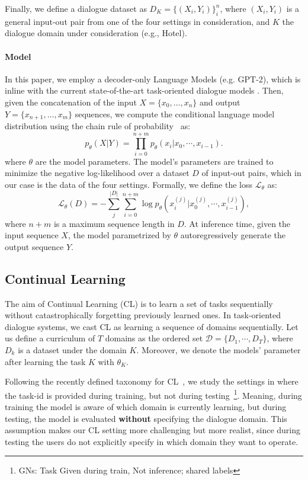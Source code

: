 \documentclass[11pt,a4paper]{article}
\begin{document}
Finally, we define a dialogue dataset as $D_K=\{(X_i,Y_i)\}_{i}^{n}$, where $(X_i,Y_i)$ is a general input-out pair from one of the four settings in consideration, and $K$ the dialogue domain under consideration (e.g., Hotel).   

\paragraph{Model} In this paper, we employ a decoder-only Language Models (e.g. GPT-2), which is inline with the current state-of-the-art task-oriented dialogue models \citet{peng2020soloist,hosseini2020simple}. Then, given the concatenation of the input $X= \{x_{0},\dots,x_{n}\}$ and output $Y= \{x_{n+1},\dots,x_{m}\}$ sequences, we compute the conditional language model distribution using the chain rule of probability~\cite{bengio2003neural} as:
\begin{equation}
    p_{\theta}(X|Y) =  \prod_{i=0}^{n+m}p_{\theta}(x_i|x_{0}, \cdots, x_{i-1}).
\end{equation}
where $\theta$ are the model parameters. The model's parameters are trained to minimize the negative log-likelihood over a dataset $D$ of input-out pairs, which in our case is the data of the four settings. Formally, we define the loss $\mathcal{L}_{\theta}$ as:
\begin{equation}
  \mathcal{L}_{\theta}(D) =  - \sum_j^{|D|} \sum_{i=0}^{n+m} \log p_{\theta}(x_i^{(j)}|x_{0}^{(j)}, \cdots, x_{i-1}^{(j)}), \label{eq:loss}
\end{equation}
where $n+m$ is a maximum sequence length in $D$. At inference time, given the input sequence $X$, the model parametrized by $\theta$ autoregressively generate the output sequence $Y$. 
\subsection{Continual Learning} \label{subsec:CL}
The aim of Continual Learning (CL) is to learn a set of tasks sequentially without catastrophically forgetting previously learned ones. In task-oriented dialogue systems, we cast CL as learning a sequence of domains sequentially. Let us define a curriculum of $T$ domains as the ordered set $\mathcal{D}=\{D_1, \cdots, D_T\}$, where $D_k$ is a dataset under the domain $K$. Moreover, we denote the models' parameter after learning the task $K$ with $\theta_K$. 

Following the recently defined taxonomy for CL~\cite{wortsman2020supermasks}, we study the settings in where the task-id is provided during training, but not during testing~\footnote{GNs: Task Given during train, Not inference; shared labels}. Meaning, during training the model is aware of which domain is currently learning, but during testing, the model is evaluated \textbf{without} specifying the dialogue domain. This assumption makes our CL setting more challenging but more realist, since during testing the users do not explicitly specify in which domain they want to operate. 
\end{document}
